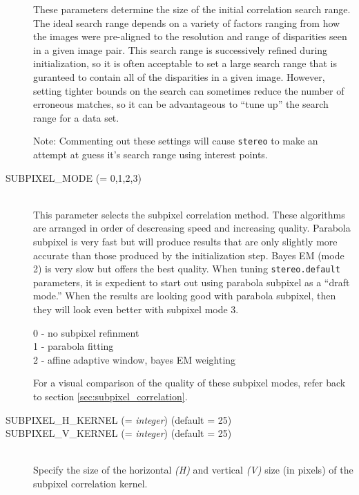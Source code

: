 \begin{description}
  These parameters determine the size of the initial correlation
  search range.  The ideal search range depends on a variety of
  factors ranging from how the images were pre-aligned to the
  resolution and range of disparities seen in a given image pair.
  This search range is successively refined during initialization, so
  it is often acceptable to set a large search range that is guranteed
  to contain all of the disparities in a given image.  However,
  setting tighter bounds on the search can sometimes reduce the number
  of erroneous matches, so it can be advantageous to ``tune up'' the
  search range for a data set.

  Note: Commenting out these settings will cause {\tt stereo} to make an
  attempt at guess it's search range using interest points.

\item[SUBPIXEL\_MODE \textnormal{\small{(= 0,1,2,3)}}] \hfill \\

  This parameter selects the subpixel correlation method. These
  algorithms are arranged in order of descreasing speed and increasing
  quality. Parabola subpixel is very fast but will produce results
  that are only slightly more accurate than those produced by the
  initialization step. Bayes EM (mode 2) is very slow but offers the
  best quality. When tuning {\tt stereo.default} parameters, it is
  expedient to start out using parabola subpixel as a ``draft mode.''
  When the results are looking good with parabola subpixel, then they
  will look even better with subpixel mode 3.

  \begin{description}
    \item[0 - no subpixel refinment]
    \item[1 - parabola fitting ]
    \item[2 - affine adaptive window, bayes EM weighting ]
  \end{description}

  For a visual comparison of the quality of these subpixel modes,
  refer back to section \ref{sec:subpixel_correlation}.

\item[SUBPIXEL\_H\_KERNEL \textnormal{\small{(= \emph{integer})}} (default = 25)]
\item[SUBPIXEL\_V\_KERNEL \textnormal{\small{(= \emph{integer})}} (default = 25)] \hfill \\

  Specify the size of the horizontal \emph{(H)} and vertical
  \emph{(V)} size (in pixels) of the subpixel correlation kernel.

\end{description}

